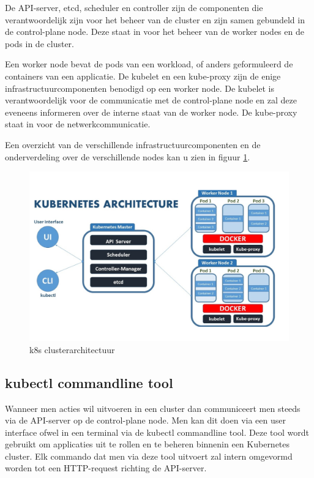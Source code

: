 De API-server, etcd, scheduler en controller zijn de componenten die verantwoordelijk zijn voor het beheer van de cluster en zijn samen gebundeld in de control-plane node. Deze staat in voor het beheer van de worker nodes en de pods in de cluster.

Een worker node bevat de pods van een workload, of anders geformuleerd de containers van een applicatie. De kubelet en een kube-proxy zijn de enige infrastructuurcomponenten benodigd op een worker node. De kubelet is verantwoordelijk voor de communicatie met de control-plane node en zal deze eveneens informeren over de interne staat van de worker node. De kube-proxy staat in voor de netwerkcommunicatie. 

Een overzicht van de verschillende infrastructuurcomponenten en de onderverdeling over de verschillende nodes kan u zien in figuur \ref{k8s-architectuur}. 

\begin{figure}[h]
    \centering
    \includegraphics[scale=.7]{img/k8s-architecture.png}
    \caption{k8s clusterarchitectuur \autocite{Collabnix2019}}
    \label{k8s-architectuur}
\end{figure}

\subsection{kubectl commandline tool}

Wanneer men acties wil uitvoeren in een cluster dan communiceert men steeds via de API-server op de control-plane node. Men kan dit doen via een user interface ofwel in een terminal via de kubectl commandline tool. Deze tool wordt gebruikt om applicaties uit te rollen en te beheren binnenin een Kubernetes cluster.
Elk commando dat men via deze tool uitvoert zal intern omgevormd worden tot een HTTP-request richting de API-server. \autocite{Biradar2019}
   

